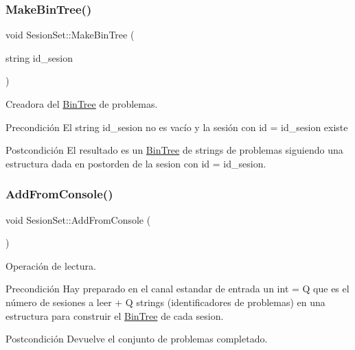 \subsubsection{\texorpdfstring{Make\+Bin\+Tree()}{MakeBinTree()}}
{\footnotesize\ttfamily void Sesion\+Set\+::\+Make\+Bin\+Tree (\begin{DoxyParamCaption}\item[{string}]{id\+\_\+sesion }\end{DoxyParamCaption})}



Creadora del \mbox{\hyperlink{class_bin_tree}{Bin\+Tree}} de problemas. 

\begin{DoxyPrecond}{Precondición}
El string id\+\_\+sesion no es vacío y la sesión con id = id\+\_\+sesion existe 
\end{DoxyPrecond}
\begin{DoxyPostcond}{Postcondición}
El resultado es un \mbox{\hyperlink{class_bin_tree}{Bin\+Tree}} de strings de problemas siguiendo una estructura dada en postorden de la sesion con id = id\+\_\+sesion. 
\end{DoxyPostcond}
\mbox{\label{class_sesion_set_a683506f0dc85b15392e77ebe4e6cc266}} 
\subsubsection{\texorpdfstring{Add\+From\+Console()}{AddFromConsole()}}
{\footnotesize\ttfamily void Sesion\+Set\+::\+Add\+From\+Console (\begin{DoxyParamCaption}{ }\end{DoxyParamCaption})}



Operación de lectura. 

\begin{DoxyPrecond}{Precondición}
Hay preparado en el canal estandar de entrada un int = Q que es el número de sesiones a leer + Q strings (identificadores de problemas) en una estructura para construir el \mbox{\hyperlink{class_bin_tree}{Bin\+Tree}} de cada sesion. 
\end{DoxyPrecond}
\begin{DoxyPostcond}{Postcondición}
Devuelve el conjunto de problemas completado. 
\end{DoxyPostcond}
\mbox{\label{class_sesion_set_a33e38d89cd960e91aa593ca99fdbee3d}} 
